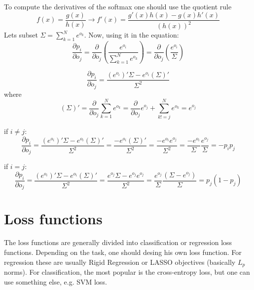 \documentclass{article}
\begin{document}
To compute the derivatives of the softmax one should use the quotient rule
\begin{equation}
    \label{2}
    f(x) = \frac{g(x)}{h(x)} \rightarrow f'(x)= \frac{g'(x) h(x) - g(x) h'(x)}{(h(x))^2}
\end{equation}
Lets subset $\Sigma = {\sum_{k=1}^{N} e^{o_k}}$. Now, using it in the equation:
\begin{equation}
    \label{3}
    \frac{\partial{p_i}}{\partial{o_j}} = \frac{\partial}{\partial{o_j}} (\frac{e^{o_i}}{\sum_{k=1}^{N} e^{o_k}}) = \frac{\partial}{\partial{o_j}} (\frac{e^{o_i}}{\Sigma})
\end{equation}

\begin{equation}
    \label{4}
    \frac{\partial{p_i}}{\partial{o_j}} = \frac{(e^{o_i})' \Sigma - e^{o_i} (\Sigma)'}{\Sigma ^2}
\end{equation}
where
\begin{equation}
    \label{5}
    (\Sigma)' = \frac{\partial}{\partial o_j} {\sum_{k=1}^{N} e^{o_k}} = \frac{\partial}{\partial o_j} e^{o_j} + {\sum_{k!=j}^{N} e^{o_k}} = e^{o_j}
\end{equation}

if $i \neq j$:
\begin{equation}
    \label{6}
    \frac{\partial{p_i}}{\partial{o_j}} = \frac{(e^{o_i})' \Sigma - e^{o_i} (\Sigma)'}{\Sigma ^2} = \frac{ - e^{o_i} (\Sigma)'}{\Sigma^2} = \frac{ - e^{o_i} e^{o_j}}{\Sigma^2} = \frac{- e^{o_i}}{\Sigma} \frac{e^{o_j}}{\Sigma} = -p_i p_j
\end{equation}

if $i=j$:
\begin{equation}
    \label{7}
\frac{\partial{p_i}}{\partial{o_j}} = \frac{(e^{o_i})' \Sigma - e^{o_i} (\Sigma)'}{\Sigma ^2} = \frac{e^{o_j} \Sigma - e^{o_j} e^{o_j}}{\Sigma ^2} = \frac{e^{o_j}}{\Sigma} \frac{(\Sigma - e^{o_j})}{\Sigma} = p_j(1-p_j)
\end{equation}









\section{Loss functions}
The loss functions are generally divided into classification or regression loss functions. Depending on the task, one should desing his own loss function. For regression these are usually Rigid Regression or LASSO objectives (basically $L_p$ norms). For classification, the most popular is the cross-entropy loss, but one can use something else, e.g. SVM loss.
\end{document}
